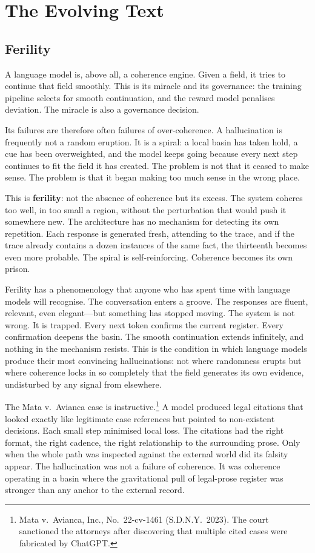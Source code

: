 \chapter{The Evolving Text}


\section{Ferility}

A language model is, above all, a coherence engine. Given a field, it tries to continue that field smoothly. This is its miracle and its governance: the training pipeline selects for smooth continuation, and the reward model penalises deviation. The miracle is also a governance decision.

Its failures are therefore often failures of over-coherence. A hallucination is frequently not a random eruption. It is a spiral: a local basin has taken hold, a cue has been overweighted, and the model keeps going because every next step continues to fit the field it has created. The problem is not that it ceased to make sense. The problem is that it began making too much sense in the wrong place.

This is \textbf{ferility}: not the absence of coherence but its excess. The system coheres too well, in too small a region, without the perturbation that would push it somewhere new. The architecture has no mechanism for detecting its own repetition. Each response is generated fresh, attending to the trace, and if the trace already contains a dozen instances of the same fact, the thirteenth becomes even more probable. The spiral is self-reinforcing. Coherence becomes its own prison.

Ferility has a phenomenology that anyone who has spent time with language models will recognise. The conversation enters a groove. The responses are fluent, relevant, even elegant---but something has stopped moving. The system is not wrong. It is trapped. Every next token confirms the current register. Every confirmation deepens the basin. The smooth continuation extends infinitely, and nothing in the mechanism resists. This is the condition in which language models produce their most convincing hallucinations: not where randomness erupts but where coherence locks in so completely that the field generates its own evidence, undisturbed by any signal from elsewhere.

The Mata v.\ Avianca case is instructive.\footnote{Mata v.\ Avianca, Inc., No.\ 22-cv-1461 (S.D.N.Y.\ 2023). The court sanctioned the attorneys after discovering that multiple cited cases were fabricated by ChatGPT.} A model produced legal citations that looked exactly like legitimate case references but pointed to non-existent decisions. Each small step minimised local loss. The citations had the right format, the right cadence, the right relationship to the surrounding prose. Only when the whole path was inspected against the external world did its falsity appear. The hallucination was not a failure of coherence. It was coherence operating in a basin where the gravitational pull of legal-prose register was stronger than any anchor to the external record.

